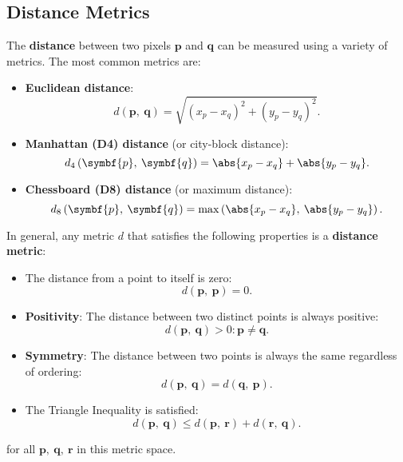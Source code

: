 \documentclass{article}
\begin{document}
\subsection{Distance Metrics}
The \textbf{distance} between two pixels \(\symbf{p}\) and
\(\symbf{q}\) can be measured using a variety of metrics. The most
common metrics are:
\begin{itemize}
    \item \textbf{Euclidean distance}:
          \begin{equation*}
              d\left( \symbf{p},\: \symbf{q} \right) = \sqrt{\left( x_p - x_q \right)^2 + \left( y_p - y_q \right)^2}.
          \end{equation*}
    \item \textbf{Manhattan (D4) distance} (or city-block distance):
          \begin{equation*}
              d_4\left( \symbf{p},\: \symbf{q} \right) = \abs{x_p - x_q} + \abs{y_p - y_q}.
          \end{equation*}
    \item \textbf{Chessboard (D8) distance} (or maximum distance):
          \begin{equation*}
              d_8\left( \symbf{p},\: \symbf{q} \right) = \max\left( \abs{x_p - x_q},\: \abs{y_p - y_q} \right).
          \end{equation*}
\end{itemize}
In general, any metric \(d\) that satisfies the following properties is a
\textbf{distance metric}:
\begin{itemize}
    \item The distance from a point to itself is zero:
          \begin{equation*}
              d\left( \symbf{p},\: \symbf{p} \right) = 0.
          \end{equation*}
    \item \textbf{Positivity}: The distance between two distinct points is always positive:
          \begin{equation*}
              d\left( \symbf{p},\: \symbf{q} \right) > 0 : \symbf{p} \neq \symbf{q}.
          \end{equation*}
    \item \textbf{Symmetry}: The distance between two points is always the same regardless of ordering:
          \begin{equation*}
              d\left( \symbf{p},\: \symbf{q} \right) = d\left( \symbf{q},\: \symbf{p} \right).
          \end{equation*}
    \item The Triangle Inequality is satisfied:
          \begin{equation*}
              d\left( \symbf{p},\: \symbf{q} \right) \leq d\left( \symbf{p},\: \symbf{r} \right) + d\left( \symbf{r},\: \symbf{q} \right).
          \end{equation*}
\end{itemize}
for all \(\symbf{p},\: \symbf{q},\: \symbf{r}\) in this metric space.
\end{document}
